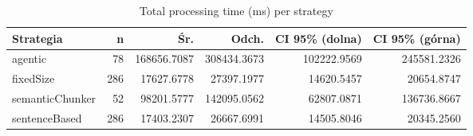 \begin{table}[H]
    \centering
    \caption{Total processing time (ms) per strategy}
    \small
    \begin{tabular}{@{}lrrrrr@{}}
        \toprule
        \textbf{Strategia} & \textbf{n} & \textbf{Śr.} & \textbf{Odch.} & \textbf{CI 95\% (dolna)} & \textbf{CI 95\% (górna)} \\
        \midrule
        agentic & 78 & 168656.7087 & 308434.3673 & 102222.9569 & 245581.2326 \\
        fixedSize & 286 & 17627.6778 & 27397.1977 & 14620.5457 & 20654.8747 \\
        semanticChunker & 52 & 98201.5777 & 142095.0562 & 62807.0871 & 136736.8667 \\
        sentenceBased & 286 & 17403.2307 & 26667.6991 & 14505.8046 & 20345.2560 \\
        \bottomrule
    \end{tabular}
\end{table}
